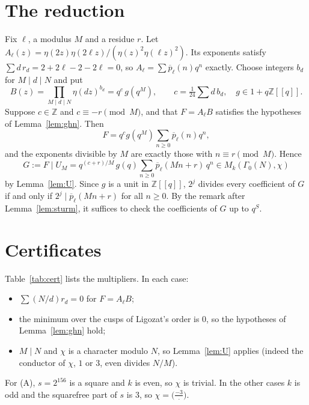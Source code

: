 \documentclass[11pt]{article}
\theoremstyle{remark}\newtheorem{remark}[theorem]{Remark}
\newcommand{\pb}{\overline{p}}
\begin{document}
\section{The reduction}
Fix $\ell$, a modulus $M$ and a residue $r$. Let $A_\ell(z)=\eta(2z)\eta(2\ell z)/(\eta(z)^2\eta(\ell z)^2)$. Its exponents satisfy $\sum d\,r_d=2+2\ell-2-2\ell=0$, so $A_\ell=\sum\pb_\ell(n)q^n$ exactly. Choose integers $b_d$ for $M\mid d\mid N$ and put
\[B(z)=\prod_{M\mid d\mid N}\eta(dz)^{b_d}=q^{c}\,g(q^M),\qquad c=\tfrac1{24}\textstyle\sum d\,b_d,\quad g\in 1+q\mathbb Z[[q]].\]
Suppose $c\in\mathbb Z$ and $c\equiv-r\pmod M$, and that $F=A_\ell B$ satisfies the hypotheses of Lemma~\ref{lem:ghn}. Then
\[F=q^c g(q^M)\sum_{n\ge0}\pb_\ell(n)q^n,\]
and the exponents divisible by $M$ are exactly those with $n\equiv r\pmod M$. Hence
\[G:=F\mid U_M=q^{(c+r)/M}\,g(q)\sum_{n\ge0}\pb_\ell(Mn+r)\,q^n\in M_k(\Gamma_0(N),\chi)\]
by Lemma~\ref{lem:U}. Since $g$ is a unit in $\mathbb Z[[q]]$, $2^j$ divides every coefficient of $G$ if and only if $2^j\mid\pb_\ell(Mn+r)$ for all $n\ge0$. By the remark after Lemma~\ref{lem:sturm}, it suffices to check the coefficients of $G$ up to $q^S$.

\section{Certificates}
Table~\ref{tab:cert} lists the multipliers. In each case:
\begin{itemize}
\item $\sum (N/d)r_d=0$ for $F=A_\ell B$;
\item the minimum over the cusps of Ligozat's order is $0$, so the hypotheses of Lemma~\ref{lem:ghn} hold;
\item $M\mid N$ and $\chi$ is a character modulo $N$, so Lemma~\ref{lem:U} applies (indeed the conductor of $\chi$, $1$ or $3$, even divides $N/M$).
\end{itemize}
For (A), $s=2^{156}$ is a square and $k$ is even, so $\chi$ is trivial. In the other cases $k$ is odd and the squarefree part of $s$ is $3$, so $\chi=\bigl(\tfrac{-3}{\cdot}\bigr)$.
\end{document}
